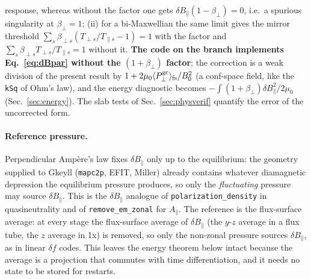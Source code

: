 \documentclass[11pt, letterpaper]{article}
\newcommand{\dBpar}{\delta B_\parallel}
\newcommand{\Apar}{A_\parallel}
\newcommand{\code}[1]{\texttt{#1}}
\begin{document}
response, whereas without the factor one gets $\dBpar(1-\beta_\perp)=0$, i.e.\ a spurious
singularity at $\beta_\perp=1$; (ii) for a bi-Maxwellian the same limit gives the mirror
threshold $\sum_s\beta_{\perp s}(T_{\perp s}/T_{\parallel s}-1)=1$ with the factor and
$\sum_s\beta_{\perp s}T_{\perp s}/T_{\parallel s}=1$ without it. \textbf{The code on the branch
implements Eq.~\eqref{eq:dBpar} without the $(1+\beta_\perp)$ factor}; the correction is a
weak division of the present result by $1+2\mu_0\langle P_\perp^{\rm gc}\rangle_{\rm fs}/B_0^2$
(a conf-space field, like the \code{kSq} of Ohm's law), and the energy diagnostic becomes
$-\int(1+\beta_\perp)\dBpar^2/2\mu_0$ (Sec.~\ref{sec:energy}). The slab tests of
Sec.~\ref{sec:physverif} quantify the error of the uncorrected form.

\paragraph{Reference pressure.}
Perpendicular Amp\`ere's law fixes $\dBpar$ only up to the equilibrium: the geometry supplied to
Gkeyll (\code{mapc2p}, EFIT, Miller) already contains whatever diamagnetic depression the
equilibrium pressure produces, so only the \emph{fluctuating} pressure may source $\dBpar$.
This is the $\dBpar$ analogue of \code{polarization\_density} in quasineutrality and of
\code{remove\_em\_zonal} for $\Apar$. The reference is the flux-surface average: at every stage
the flux-surface average of $\dBpar$ (the $y$-$z$ average in a flux tube, the $z$ average in 1x)
is removed, so only the non-zonal pressure sources $\dBpar$, as in linear $\delta f$ codes. This
leaves the energy theorem below intact because the average is a projection that commutes with
time differentiation, and it needs no state to be stored for restarts.
\end{document}
